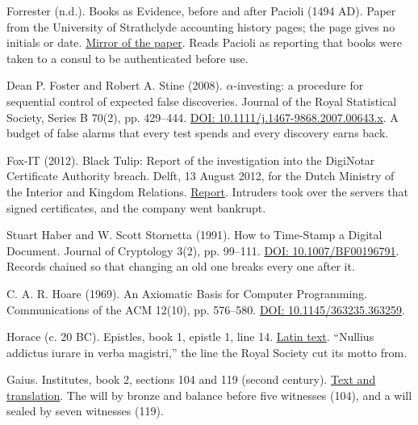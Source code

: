 \noindent Forrester (n.d.). Books as Evidence, before and after Pacioli (1494 AD). Paper from the University of Strathclyde accounting history pages; the page gives no initials or date. \href{http://www.cs.trinity.edu/rjensen/readings/history/forrester/a01before1494AD.htm}{Mirror of the paper}. Reads Pacioli as reporting that books were taken to a consul to be authenticated before use.
\par\medskip

\noindent Dean P. Foster and Robert A. Stine (2008). $\alpha$-investing: a procedure for sequential control of expected false discoveries. Journal of the Royal Statistical Society, Series B 70(2), pp. 429--444. \href{https://doi.org/10.1111/j.1467-9868.2007.00643.x}{DOI: 10.1111/j.1467-9868.2007.00643.x}. A budget of false alarms that every test spends and every discovery earns back.
\par\medskip

\noindent Fox-IT (2012). Black Tulip: Report of the investigation into the DigiNotar Certificate Authority breach. Delft, 13 August 2012, for the Dutch Ministry of the Interior and Kingdom Relations. \href{https://zoek.officielebekendmakingen.nl/blg-191225.pdf}{Report}. Intruders took over the servers that signed certificates, and the company went bankrupt.
\par\medskip

\noindent Stuart Haber and W. Scott Stornetta (1991). How to Time-Stamp a Digital Document. Journal of Cryptology 3(2), pp. 99--111. \href{https://doi.org/10.1007/BF00196791}{DOI: 10.1007/BF00196791}. Records chained so that changing an old one breaks every one after it.
\par\medskip

\noindent C. A. R. Hoare (1969). An Axiomatic Basis for Computer Programming. Communications of the ACM 12(10), pp. 576--580. \href{https://doi.org/10.1145/363235.363259}{DOI: 10.1145/363235.363259}.
\par\medskip

\noindent Horace (c. 20 BC). Epistles, book 1, epistle 1, line 14. \href{https://www.thelatinlibrary.com/horace/epist1.shtml}{Latin text}. ``Nullius addictus iurare in verba magistri,'' the line the Royal Society cut its motto from.
\par\medskip

\noindent Gaius. Institutes, book 2, sections 104 and 119 (second century). \href{https://droitromain.univ-grenoble-alpes.fr/Anglica/gai2_Poste.htm}{Text and translation}. The will by bronze and balance before five witnesses (104), and a will sealed by seven witnesses (119).
\par\medskip

